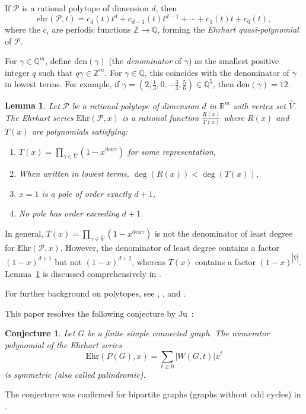 \documentclass[reqno, 12pt]{amsart}
\newtheorem{lem}[thm]{Lemma}
\newtheorem{cnj}[thm]{Conjecture}
\theoremstyle{mydefinition}
\theoremstyle{myremark}
\begin{document}
If $\mathcal{P}$ is a rational polytope of dimension $d$, then
\[
\mathrm{ehr}(\mathcal{P},t) = c_d(t)t^d + c_{d-1}(t)t^{d-1} + \cdots + c_1(t)t + c_0(t),
\]
where the $c_i$ are periodic functions $\mathbb{Z}\rightarrow \mathbb{Q}$, forming the \emph{Ehrhart quasi-polynomial} of $\mathcal{P}$.

For $\gamma \in \mathbb{Q}^m$, define $\text{den}(\gamma)$ (the \emph{denominator} of $\gamma$) as the smallest positive integer $q$ such that $q\gamma \in \mathbb{Z}^m$. For $\gamma \in \mathbb{Q}$, this coincides with the denominator of $\gamma$ in lowest terms. For example, if $\gamma = (2, \frac{1}{3}, 0, -\frac{3}{4}, \frac{5}{6}) \in \mathbb{Q}^5$, then $\text{den}(\gamma) = 12$.


\begin{lem}\cite{Ehrhart62}\label{Ehrhartpoled+1}
Let $\mathcal{P}$ be a rational polytope of dimension $d$ in $\mathbb{R}^m$ with vertex set $\widehat{V}$. The Ehrhart series $\mathrm{Ehr}(\mathcal{P},x)$ is a rational function $\frac{R(x)}{T(x)}$ where $R(x)$ and $T(x)$ are polynomials satisfying:
\begin{enumerate}
    \item $T(x) = \prod_{\gamma \in \widehat{V}} (1 - x^{\text{den}\gamma})$ for some representation,
    \item When written in lowest terms, $\deg(R(x)) < \deg(T(x))$,
    \item $x=1$ is a pole of order exactly $d+1$,
    \item No pole has order exceeding $d+1$.
\end{enumerate}
\end{lem}
In general, $T(x) = \prod_{\gamma \in \widehat{V}} (1 - x^{\text{den}\gamma})$ is not the denominator of least degree for $\mathrm{Ehr}(\mathcal{P},x)$. However, the denominator of least degree contains a factor $(1-x)^{d+1}$ but not $(1-x)^{d+2}$, whereas $T(x)$ contains a factor $(1-x)^{|\widehat{V}|}$. Lemma~\ref{Ehrhartpoled+1} is discussed comprehensively in \cite[Theorem 4.6.8]{RP.Stanley}.

For further background on polytopes, see \cite{BeckRobins}, \cite[Chapter 4]{RP.Stanley}, and \cite{Ziegler}.

This paper resolves the following conjecture by Ju~\cite{Ju07}:
\begin{cnj}\cite[Section 4]{Ju07}\label{ConjeConnGrap1}
Let $G$ be a finite simple connected graph. The numerator polynomial of the Ehrhart series
\[
\mathrm{Ehr}(P(G),x) = \sum_{t \geq 0} |W(G,t)| x^t
\]
is symmetric (also called palindromic).
\end{cnj}
The conjecture was confirmed for bipartite graphs (graphs without odd cycles) in \cite[Theorem 3.6]{BonaJu07}.
\end{document}
